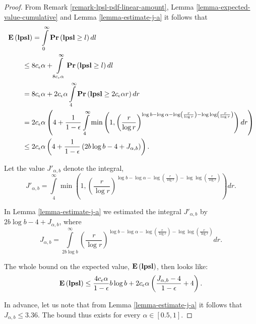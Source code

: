 \begin{proof}
From Remark \ref{remark-lpsl-pdf-linear-amount}, Lemma \ref{lemma-expected-value-cumulative} and Lemma \ref{lemma-estimate-j-a} it follows that
\[
\begin{split}
& \mathbf{E}\left(\mathbf{lpsl}\right)
	= \int\limits_0^\infty \mathbf{Pr}\left(\mathbf{lpsl} \geq l\right) dl \\ 
	& \qquad \leq 8 c_\epsilon \alpha + \int\limits_{8 c_\epsilon \alpha}^\infty \mathbf{Pr}\left(\mathbf{lpsl} \geq l\right) dl \\ 
	& \qquad = 8c_\epsilon \alpha + 2 c_\epsilon \alpha \int\limits_{4}^\infty \mathbf{Pr}\left(\mathbf{lpsl} \geq 2c_\epsilon \alpha r\right) dr \\
	& \qquad = 2c_\epsilon \alpha \left(4 + \frac{1}{1 - \epsilon} \int\limits_{4}^\infty \min\left(1, \left(\frac{r}{\log r}\right)^{\log b - \log \alpha - \log \left(\frac{r}{\log r}\right) - \log \log \left(\frac{r}{\log r}\right)}\right) dr \right) \\ 
	& \qquad \leq 2c_\epsilon \alpha \left( 4 + \frac{1}{1-\epsilon}\left( 2 b \log b - 4 + J_{\alpha, b} \right) \right) \text{.}
\end{split}
\]

Let the value $J'_{\alpha, b}$ denote the integral,
\begin{equation}
\label{equality-j-prime-a-b}
J'_{\alpha, b} = \int\limits_{4}^\infty \min\left(1, \left(\frac{r}{\log r}\right)^{\log b - \log \alpha - \log \left(\frac{r}{\log r}\right) - \log \log \left(\frac{r}{\log r}\right)}\right) dr \text{.}
\end{equation}

In Lemma \ref{lemma-estimate-j-a} we estimated the integral $J'_{\alpha, b}$ by $2 b \log b - 4 +  J_{\alpha, b}$, where
\begin{equation}
\label{equality-j-a-b}
J_{\alpha, b} = \int\limits_{2 b \log b}^\infty \left(\frac{r}{\log r}\right)^{\log b - \log \alpha - \log \left(\frac{r}{\log r}\right) - \log \log \left(\frac{r}{\log r}\right)} dr \text{.}
\end{equation}

The whole bound on the expected value, $\mathbf{E}\left(\mathbf{lpsl}\right)$, then looks like:
\[
\mathbf{E}\left(\mathbf{lpsl}\right) \leq \frac{4 c_\epsilon \alpha}{1 - \epsilon} b \log b + 2 c_\epsilon \alpha \left( \frac{J_{\alpha, b} - 4}{1 - \epsilon} + 4 \right) \text{.}
\]

In advance, let us note that from Lemma \ref{lemma-estimate-j-a} it follows that $J_{\alpha, b} \leq 3.36$. The bound thus exists for every $\alpha \in [0.5, 1]$.
\end{proof}

